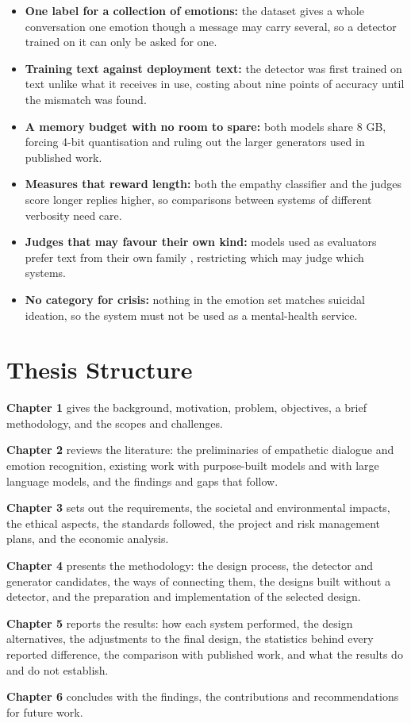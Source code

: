 \begin{itemize}
  \item \textbf{One label for a collection of emotions: }the dataset gives a whole conversation one emotion though a message may carry several, so a detector trained on it can only be asked for one.
  \item \textbf{Training text against deployment text: }the detector was first trained on text unlike what it receives in use, costing about nine points of accuracy until the mismatch was found.
  \item \textbf{A memory budget with no room to spare: }both models share 8 GB, forcing 4-bit quantisation and ruling out the larger generators used in published work.
  \item \textbf{Measures that reward length: }both the empathy classifier and the judges score longer replies higher, so comparisons between systems of different verbosity need care.
  \item \textbf{Judges that may favour their own kind: }models used as evaluators prefer text from their own family \cite{panickssery2024}, restricting which may judge which systems.
  \item \textbf{No category for crisis: }nothing in the emotion set matches suicidal ideation, so the system must not be used as a mental-health service.
\end{itemize}

\section{Thesis Structure}
\label{sec:1.7}

\textbf{Chapter 1} gives the background, motivation, problem, objectives, a brief methodology, and the scopes and challenges.

\textbf{Chapter 2} reviews the literature: the preliminaries of empathetic dialogue and emotion recognition, existing work with purpose-built models and with large language models, and the findings and gaps that follow.

\textbf{Chapter 3} sets out the requirements, the societal and environmental impacts, the ethical aspects, the standards followed, the project and risk management plans, and the economic analysis.

\textbf{Chapter 4} presents the methodology: the design process, the detector and generator candidates, the ways of connecting them, the designs built without a detector, and the preparation and implementation of the selected design.

\textbf{Chapter 5} reports the results: how each system performed, the design alternatives, the adjustments to the final design, the statistics behind every reported difference, the comparison with published work, and what the results do and do not establish.

\textbf{Chapter 6} concludes with the findings, the contributions and recommendations for future work.
